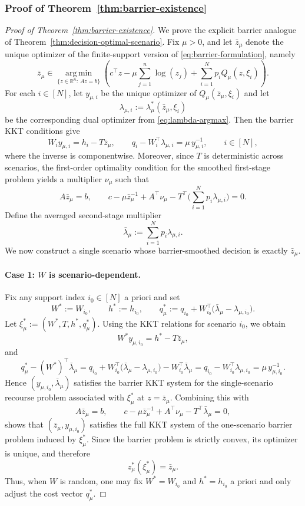 \documentclass{article}
\newcommand{\R}{\mathbb{R}}
\theoremstyle{plain}
\theoremstyle{definition}
\theoremstyle{remark}
\begin{document}
\subsubsection{Proof of Theorem~\ref{thm:barrier-existence}}
\begin{proof}[Proof of Theorem~\ref{thm:barrier-existence}]
We prove the explicit barrier analogue of Theorem~\ref{thm:decision-optimal-scenario}. Fix $\mu>0$, and let $\bar z_\mu$ denote the unique optimizer of the finite-support version of \eqref{eq:barrier-formulation}, namely
\[
\bar z_\mu
\in
\operatorname*{arg\,min}_{\{z\in\R^n:\,Az=b\}}
\left(
 c^\top z
 -
 \mu\sum_{j=1}^{n}\log(z_j)
 +
 \sum_{i=1}^N p_i Q_\mu(z,\xi_i)
\right).
\]
For each $i\in[N]$, let $y_{\mu,i}$ be the unique optimizer of $Q_\mu(\bar z_\mu,\xi_i)$ and let
\[
\lambda_{\mu,i}:=\lambda_\mu^*(\bar z_\mu,\xi_i)
\]
be the corresponding dual optimizer from \eqref{eq:lambda-argmax}. Then the barrier KKT conditions give
\[
W_i y_{\mu,i}=h_i-T\bar z_\mu,
\qquad
q_i-W_i^\top\lambda_{\mu,i}=\mu\,y_{\mu,i}^{-1},
\qquad i\in[N],
\]
where the inverse is componentwise. Moreover, since $T$ is deterministic across scenarios, the first-order optimality condition for the smoothed first-stage problem yields a multiplier $\nu_\mu$ such that
\[
A\bar z_\mu=b,
\qquad
c-\mu\bar z_\mu^{-1}+A^\top\nu_\mu-T^\top\Big(\sum_{i=1}^N p_i\lambda_{\mu,i}\Big)=0.
\]
Define the averaged second-stage multiplier
\[
\bar\lambda_\mu:=\sum_{i=1}^N p_i\lambda_{\mu,i}.
\]
We now construct a single scenario whose barrier-smoothed decision is exactly $\bar z_\mu$.

\paragraph{Case 1: $W$ is scenario-dependent.}
Fix any support index $i_0\in[N]$ a priori and set
\[
W^*:=W_{i_0},
\qquad
h^*:=h_{i_0},
\qquad
q_\mu^*:=q_{i_0}+W_{i_0}^\top\big(\bar\lambda_\mu-\lambda_{\mu,i_0}\big).
\]
Let $\xi_\mu^*:=(W^*,T,h^*,q_\mu^*)$. Using the KKT relations for scenario $i_0$, we obtain
\[
W^* y_{\mu,i_0}=h^*-T\bar z_\mu,
\]
and
\[
q_\mu^*-(W^*)^\top\bar\lambda_\mu
=
q_{i_0}+W_{i_0}^\top\big(\bar\lambda_\mu-\lambda_{\mu,i_0}\big)-W_{i_0}^\top\bar\lambda_\mu
=
q_{i_0}-W_{i_0}^\top\lambda_{\mu,i_0}
=
\mu\,y_{\mu,i_0}^{-1}.
\]
Hence $(y_{\mu,i_0},\bar\lambda_\mu)$ satisfies the barrier KKT system for the single-scenario recourse problem associated with $\xi_\mu^*$ at $z=\bar z_\mu$. Combining this with
\[
A\bar z_\mu=b,
\qquad
c-\mu\bar z_\mu^{-1}+A^\top\nu_\mu-T^\top\bar\lambda_\mu=0,
\]
shows that $(\bar z_\mu,y_{\mu,i_0})$ satisfies the full KKT system of the one-scenario barrier problem induced by $\xi_\mu^*$. Since the barrier problem is strictly convex, its optimizer is unique, and therefore
\[
z_\mu^*(\xi_\mu^*)=\bar z_\mu.
\]
Thus, when $W$ is random, one may fix $W^*=W_{i_0}$ and $h^*=h_{i_0}$ a priori and only adjust the cost vector $q_\mu^*$.


\end{proof}
\end{document}
